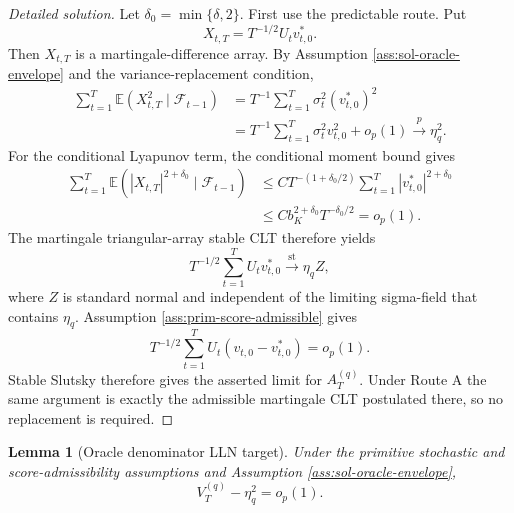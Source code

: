 \documentclass[12pt]{article}
\numberwithin{equation}{section}
\newtheorem{lemma}{Lemma}
\theoremstyle{definition}
\newcommand{\E}{\mathbb E}
\begin{document}
\begin{proof}[Detailed solution]
Let \(\delta_0=\min\{\delta,2\}\).  First use the predictable route.  Put
\[
    X_{t,T}=T^{-1/2}U_tv_{t,0}^\ast.
\]
Then \(X_{t,T}\) is a martingale-difference array.  By Assumption
\ref{ass:sol-oracle-envelope} and the variance-replacement condition,
\begin{align*}
    \sum_{t=1}^T\E(X_{t,T}^2\mid\mathcal F_{t-1})
    &=T^{-1}\sum_{t=1}^T\sigma_t^2(v_{t,0}^\ast)^2\\
    &=T^{-1}\sum_{t=1}^T\sigma_t^2v_{t,0}^2+o_p(1)
      \xrightarrow{p}\eta_q^2.
\end{align*}
For the conditional Lyapunov term, the conditional moment bound gives
\begin{align*}
    \sum_{t=1}^T
      \E(|X_{t,T}|^{2+\delta_0}\mid\mathcal F_{t-1})
    &\leq
      C T^{-(1+\delta_0/2)}
      \sum_{t=1}^T|v_{t,0}^\ast|^{2+\delta_0}\\
    &\leq
      C b_K^{2+\delta_0}T^{-\delta_0/2}
      =o_p(1).
\end{align*}
The martingale triangular-array stable CLT therefore yields
\[
    T^{-1/2}\sum_{t=1}^TU_tv_{t,0}^\ast
    \xrightarrow{\mathrm{st}}\eta_qZ,
\]
where \(Z\) is standard normal and independent of the limiting sigma-field
that contains \(\eta_q\).  Assumption \ref{ass:prim-score-admissible} gives
\[
    T^{-1/2}\sum_{t=1}^TU_t(v_{t,0}-v_{t,0}^\ast)=o_p(1).
\]
Stable Slutsky therefore gives the asserted limit for \(A_T^{(q)}\).  Under
Route A the same argument is exactly the admissible martingale CLT postulated
there, so no replacement is required.
\end{proof}


\begin{lemma}[Oracle denominator LLN target]
\label{lem:wb-oracle-lln}
Under the primitive stochastic and score-admissibility assumptions and
Assumption \ref{ass:sol-oracle-envelope},
\[
    V_T^{(q)}-\eta_q^2=o_p(1).
\]
\end{lemma}
\end{document}
